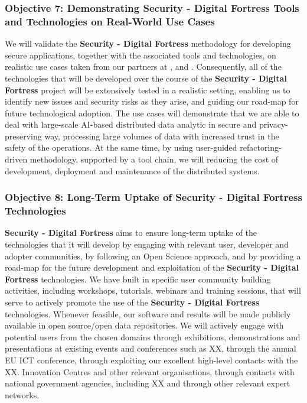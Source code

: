 \documentclass[a4paper,11pt]{article}
\newcommand{\project}[1]{\textbf{#1}\xspace}
\newcommand{\SECURITY}{\project{Security - Digital Fortress}}
\newcommand{\TheProject}{\SECURITY}
\begin{document}
\subsubsection*{Objective 7: Demonstrating \TheProject{} Tools and Technologies on Real-World Use Cases}
\vspace{-6pt}
We will validate the \TheProject{} methodology for developing secure applications, together with the associated tools and technologies, on realistic use cases taken from our partners at \SOPRAshort{}, \FRQshort{} and \DEMshort{}.
Consequently, all of the technologies that will be developed over the course of the \TheProject{} project will be extensively tested in a realistic setting, enabling us to identify new issues and security risks as they arise, and guiding our road-map for future technological adoption. The use cases will demonstrate that we are able to deal with large-scale AI-based distributed data analytic in secure and privacy-preserving way, processing large volumes of data with increased trust in the safety of the operations. At the same time, by using user-guided refactoring-driven methodology, supported by a tool chain, we will reducing the cost of development, deployment and maintenance of the distributed systems.

\subsubsection*{Objective 8: Long-Term Uptake of \TheProject{} Technologies} 
\vspace{-7pt}
\TheProject{} aims to ensure long-term uptake of the technologies that it will develop by engaging with relevant user, developer and adopter communities, by following an Open Science approach, and by providing a road-map for the future development and exploitation of the \TheProject{} technologies. We have built in specific user community building activities, including workshops, tutorials, webinars and training sessions, that will serve to actively promote the use of the \TheProject{} technologies. Whenever feasible, our software and results will be made publicly available in open source/open data repositories. We will actively engage with potential users from the chosen domains through exhibitions, demonstrations and presentations at existing events and conferences such as XX, through the annual EU ICT conference, through exploiting our excellent high-level contacts with the XX. Innovation Centres and other relevant organisations, through contacts with national government agencies, including XX and through other relevant expert networks.
\end{document}
